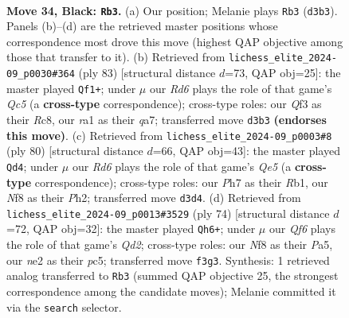 \documentclass[11pt]{article}
\begin{document}
\clearpage

\begin{figure}[p]\centering
\begin{subfigure}{0.46\textwidth}\centering
\resizebox{\linewidth}{!}{%
\newchessgame
\chessboard[
  setfen={5n2/pp4kp/7p/1P6/3P4/3r1q2/2Q1N3/R5KR b - - 4 34},
  showmover=false,
  pgfstyle=straightmove, color=movearrow, markmove={d3-b3}
]}
\caption{}
\end{subfigure}\hfill
\begin{subfigure}{0.46\textwidth}\centering
\resizebox{\linewidth}{!}{%
\newchessgame
\chessboard[
  setfen={2r3k1/Q1N2pp1/1p1Rp2p/8/P1q5/8/8/2RK4 b - - 17 42},
  showmover=false,
  pgfstyle=straightmove, color=movearrow, markmove={c4-f1}
]}
\caption{}
\end{subfigure}
\\[4pt]
\begin{subfigure}{0.46\textwidth}\centering
\resizebox{\linewidth}{!}{%
\newchessgame
\chessboard[
  setfen={5r1k/7p/p4Nn1/4Q3/P7/q1p5/6PP/1R5K w - - 3 41},
  showmover=false,
  pgfstyle=straightmove, color=movearrow, markmove={e5-d4}
]}
\caption{}
\end{subfigure}\hfill
\begin{subfigure}{0.46\textwidth}\centering
\resizebox{\linewidth}{!}{%
\newchessgame
\chessboard[
  setfen={6rk/1R6/p2p1q2/P1pn1N2/7P/5P2/3Q3P/7K w - - 1 38},
  showmover=false,
  pgfstyle=straightmove, color=movearrow, markmove={d2-h6}
]}
\caption{}
\end{subfigure}
\caption{\textbf{Move 34, Black: \texttt{Rb3}.} (a) Our position; Melanie plays \texttt{Rb3} (\texttt{d3b3}). Panels (b)--(d) are the retrieved master positions whose correspondence most drove this move (highest QAP objective among those that transfer to it). (b) Retrieved from \texttt{lichess\_elite\_2024-09\_p0030\#364} (ply 83) [structural distance $d$=73, QAP obj=25]: the master played \texttt{Qf1+}; under $\mu$ our \emph{Rd6} plays the role of that game's \emph{Qc5} (a \textbf{cross-type} correspondence); cross-type roles: our \emph{Q}f3 as their \emph{R}c8, our \emph{r}a1 as their \emph{q}a7; transferred move \texttt{d3b3} \textbf{(endorses this move)}. (c) Retrieved from \texttt{lichess\_elite\_2024-09\_p0003\#8} (ply 80) [structural distance $d$=66, QAP obj=43]: the master played \texttt{Qd4}; under $\mu$ our \emph{Rd6} plays the role of that game's \emph{Qe5} (a \textbf{cross-type} correspondence); cross-type roles: our \emph{P}h7 as their \emph{R}b1, our \emph{N}f8 as their \emph{P}h2; transferred move \texttt{d3d4}. (d) Retrieved from \texttt{lichess\_elite\_2024-09\_p0013\#3529} (ply 74) [structural distance $d$=72, QAP obj=32]: the master played \texttt{Qh6+}; under $\mu$ our \emph{Qf6} plays the role of that game's \emph{Qd2}; cross-type roles: our \emph{N}f8 as their \emph{P}a5, our \emph{n}e2 as their \emph{p}c5; transferred move \texttt{f3g3}. Synthesis: 1 retrieved analog transferred to \texttt{Rb3} (summed QAP objective 25, the strongest correspondence among the candidate moves); Melanie committed it via the \texttt{search} selector.}
\label{fig:thought-m67}
\end{figure}
\end{document}
